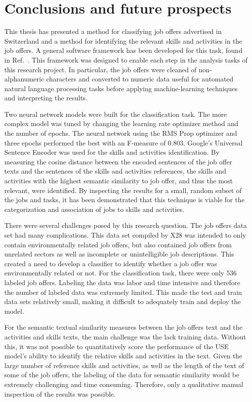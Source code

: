 \chapter{Conclusions and future prospects}
\label{sec:conclusions}
This thesis has presented a method for classifying job offers advertised in Switzerland and a method for identifying the relevant skills and activities in the job offers. A general software framework has been developed for this task, found in Ref.~\cite{emilysharata}. This framework was designed to enable each step in the analysis tasks of this research project. In particular, the job offers were cleaned of non-alphanumeric characters and converted to numeric data useful for automated natural language processing tasks before applying machine-learning techniques and interpreting the results.

Two neural network models were built for the classification task. The more complex model was tuned by changing the learning rate optimizer method and the number of epochs. The neural network using the RMS Prop optimizer and three epochs performed the best with an F-measure of 0.803. Google's Universal Sentence Encoder was used for the skills and activities identification. By measuring the cosine distance between the encoded sentences of the job offer texts and the sentences of the skills and activities references, the skills and activities with the highest semantic similarity to job offer, and thus the most relevant, were identified. By inspecting the results for a small, random subset of the jobs and tasks, it has been demonstrated that this technique is viable for the categorization and association of jobs to skills and activities.

There were several challenges posed by this research question. The job offers data set had many complications. This data set compiled by X28 was intended to only contain environmentally related job offers, but also contained job offers from unrelated sectors as well as incomplete or unintelligible job descriptions. This created a need to develop a classifier to identify whether a job offer was environmentally related or not. For the classification task, there were only 536 labeled job offers. Labeling the data was labor and time intensive and therefore the number of labeled data was extremely limited. This made the test and train data sets relatively small, making it difficult to adequately train and deploy the model.

For the semantic textual similarity measures between the job offers text and the activities and skills texts, the main challenge was the lack training data. Without this, it was not possible to quantitatively score the performance of the USE model's ability to identify the relative skills and activities in the text. Given the large number of reference skills and activities, as well as the length of the text of some of the job offers, the labeling of the data for semantic similarity would be extremely challenging and time consuming. Therefore, only a qualitative manual inspection of the results was possible. 

